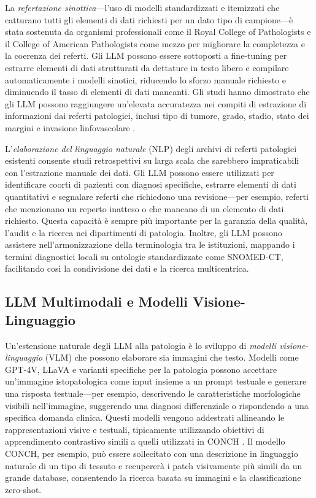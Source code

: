 La \emph{refertazione sinottica}---l'uso di modelli standardizzati e itemizzati che catturano tutti gli elementi di dati richiesti per un dato tipo di campione---è stata sostenuta da organismi professionali come il Royal College of Pathologists e il College of American Pathologists come mezzo per migliorare la completezza e la coerenza dei referti. Gli LLM possono essere sottoposti a fine-tuning per estrarre elementi di dati strutturati da dettature in testo libero e compilare automaticamente i modelli sinotici, riducendo lo sforzo manuale richiesto e diminuendo il tasso di elementi di dati mancanti. Gli studi hanno dimostrato che gli LLM possono raggiungere un'elevata accuratezza nei compiti di estrazione di informazioni dai referti patologici, inclusi tipo di tumore, grado, stadio, stato dei margini e invasione linfovascolare \cite{bankhead2022}.

L'\emph{elaborazione del linguaggio naturale} (NLP) degli archivi di referti patologici esistenti consente studi retrospettivi su larga scala che sarebbero impraticabili con l'estrazione manuale dei dati. Gli LLM possono essere utilizzati per identificare coorti di pazienti con diagnosi specifiche, estrarre elementi di dati quantitativi e segnalare referti che richiedono una revisione---per esempio, referti che menzionano un reperto inatteso o che mancano di un elemento di dati richiesto. Questa capacità è sempre più importante per la garanzia della qualità, l'audit e la ricerca nei dipartimenti di patologia. Inoltre, gli LLM possono assistere nell'armonizzazione della terminologia tra le istituzioni, mappando i termini diagnostici locali su ontologie standardizzate come SNOMED-CT, facilitando così la condivisione dei dati e la ricerca multicentrica.

\subsection{LLM Multimodali e Modelli Visione-Linguaggio}

Un'estensione naturale degli LLM alla patologia è lo sviluppo di \emph{modelli visione-linguaggio} (VLM) che possono elaborare sia immagini che testo. Modelli come GPT-4V, LLaVA e varianti specifiche per la patologia possono accettare un'immagine istopatologica come input insieme a un prompt testuale e generare una risposta testuale---per esempio, descrivendo le caratteristiche morfologiche visibili nell'immagine, suggerendo una diagnosi differenziale o rispondendo a una specifica domanda clinica. Questi modelli vengono addestrati allineando le rappresentazioni visive e testuali, tipicamente utilizzando obiettivi di apprendimento contrastivo simili a quelli utilizzati in CONCH \cite{wang2024}. Il modello CONCH, per esempio, può essere sollecitato con una descrizione in linguaggio naturale di un tipo di tessuto e recupererà i patch visivamente più simili da un grande database, consentendo la ricerca basata su immagini e la classificazione zero-shot.

